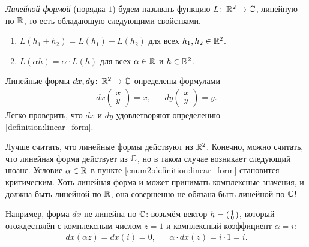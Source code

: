 \documentclass[../complex-analysis.tex]{subfiles}
\begin{document}
\begin{df}
 \label{definition:linear_form}
 \textit{Линейной формой} (порядка $1$) будем называть функцию $L \colon\, \mathbb{R}^{2} \to \mathbb{C}$, линейную по $ \mathbb{R} $, то есть обладающую следующими свойствами.
 \begin{enumerate}
  \item $L(h_1 + h_2) = L(h_1) + L(h_2)$ для всех $h_1, h_2 \in \mathbb{R}^{2}$.
  \item \label{enum2:definition:linear_form} $L(\alpha h) = \alpha \cdot L(h)$ для всех $\alpha \in \mathbb{R}$ и $h \in \mathbb{R}^{2}$.

 \end{enumerate}
\end{df}
\begin{exmpl}
 \label{example:dx_dy_linear_forms}
 Линейные формы $dx, dy \colon\, \mathbb{R}^{2} \to \mathbb{C}$ определены формулами
 \begin{align*}
  dx \begin{pmatrix}
   x \\ y
   \end{pmatrix} = x, & &dy \begin{pmatrix}
   x \\ y
  \end{pmatrix} = y.
 \end{align*} Легко проверить, что $dx$ и $dy$ удовлетворяют определению \ref{definition:linear_form}.
\end{exmpl}

\begin{remrk}
 Лучше считать, что линейные формы действуют из $\mathbb{R}^{2}$. Конечно, можно считать, что линейная форма действует из $\mathbb{C}$, но в таком случае возникает следующий нюанс. Условие $\alpha \in \mathbb{R}$ в пункте \ref{enum2:definition:linear_form} становится критическим. Хоть линейная форма и может принимать комплексные значения, и должна быть линейной по $\mathbb{R}$, она совершенно не обязана быть линейной по $\mathbb{C}$!

 Например, форма $dx$ не линейна по $\mathbb{C}$: возьмём вектор $h = \begin{psmallmatrix}
  1 \\ 0
 \end{psmallmatrix}$, который отождествлён с комплексным числом $z = 1$ и комплексный коэффициент $\alpha = i$:
 \begin{align*}
  dx(\alpha z) = dx(i) = 0, & &\alpha \cdot dx(z) = i \cdot 1 = i.
 \end{align*} 
\end{remrk}
\end{document}
